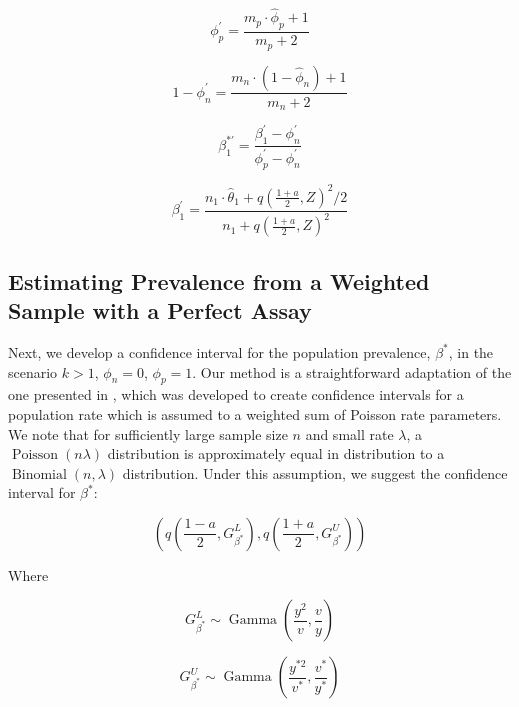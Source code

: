 \documentclass[AMA,STIX1COL]{WileyNJD-v2}
\begin{document}
\begin{equation}
    \phi_p^\prime = \frac{m_p \cdot \hat{\phi}_p + 1}{m_p + 2}
\end{equation}

\begin{equation}
   1 - \phi_n^\prime = \frac{m_n \cdot (1 - \hat{\phi}_n) + 1}{m_n + 2} 
\end{equation}

\begin{equation}
   \beta_1^{*\prime} = \frac{\beta_1^\prime - \phi_n^\prime}{\phi_p^\prime - \phi_n^\prime} 
\end{equation}

\begin{equation}
    \beta_1^\prime = \frac{n_1 \cdot \hat{\theta}_1 + q\left( \frac{1 + a}{2}, Z \right)^2 / 2}{n_1 + q\left( \frac{1 + a}{2}, Z \right)^2}
\end{equation}

\subsection{Estimating Prevalence from a Weighted Sample with a Perfect Assay}
\label{sec:weight-perfect}
Next, we develop a confidence interval for the population prevalence, \( \beta^* \), in the scenario \( k > 1 \), \( \phi_n = 0 \), \( \phi_p = 1 \).
Our method is a straightforward adaptation of the one presented in \cite{FayF:1997}, which was developed to create confidence intervals for a population rate which is assumed to a weighted sum of Poisson rate parameters.
We note that for sufficiently large sample size \( n \) and small rate \( \lambda \), a \( \operatorname{Poisson}(n\lambda) \) distribution is approximately equal in distribution to a \( \operatorname{Binomial}(n, \lambda) \) distribution.
Under this assumption, we suggest the confidence interval for \( \beta^* \):

\begin{equation}
    \left( q\left( \frac{1 - a}{2}, G_{\beta^*}^L \right), q \left( \frac{1 + a}{2},  G_{\beta^*}^U \right) \right)
\end{equation}


Where

\begin{equation}
    G_{\beta^*}^L \sim \operatorname{Gamma}\left( \frac{y^2}{v}, \frac{v}{y} \right)
\end{equation}

\begin{equation}
    G_{\beta^*}^U \sim \operatorname{Gamma}\left( \frac{y^{*2}}{v^*}, \frac{v^*}{y^*} \right)
\end{equation}
\end{document}
